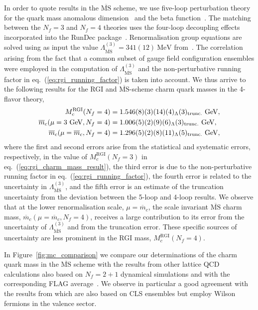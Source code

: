 In order to quote results in the $\overline{\textrm{MS}}$ scheme, we use five-loop perturbation theory for the quark
mass anomalous dimension~\cite{Baikov:2014qja,Luthe:2016xec,Baikov:2017ujl} and the beta function~\cite{Baikov:2016tgj,Herzog:2017ohr,Luthe:2017ttc}.
The matching between the $N_f=3$ and $N_f=4$ theories uses the four-loop decoupling effects~\cite{Liu:2015fxa}
incorporated into the RunDec package~\cite{Chetyrkin:2000yt,Schmidt:2012az,Herren:2017osy}. Renormalisation group equations are solved using as input the value 
$\Lambda^{(3)}_{\overline{\mathrm{MS}}} = 341(12)\ \mathrm{MeV}$ from~\cite{Bruno:2017gxd}. The correlation arising from the fact that a common subset of gauge field configuration ensembles were employed in the computation of $\Lambda^{(3)}_{\overline{\mathrm{MS}}}$ and the non-perturbative running factor in eq.~(\ref{eq:rgi_running_factor}) is taken into account. We thus arrive to the following results for the RGI and $\overline{\textrm{MS}}$-scheme charm quark masses in the 4-flavor theory,
\begin{align}
  M_c^{\mathrm{RGI}}(N_f=4)&=1.546(8)(3)(14)(4)_\Lambda(3)_{\rm trunc.} \ \mathrm{GeV},\\
  \overline{m}_c(\mu=3\ \mathrm{GeV}, N_f=4)&=1.006(5)(2)(9)(6)_\Lambda(3)_{\rm trunc.} \ \mathrm{GeV},
	\\
	\overline{m}_c(\mu=\overline{m}_c, N_f=4)&=1.296(5)(2)(8)(11)_\Lambda(5)_{\rm trunc.} \ \mathrm{GeV},
\end{align}
where the first and second errors arise from the statistical and systematic errors, respectively, in the value of $M_c^{\mathrm{RGI}}(N_f=3)$ in eq.~(\ref{eq:rgi_charm_mass_result}), the third error is due to the non-perturbative running factor in eq.~(\ref{eq:rgi_running_factor}), the fourth error is related to the uncertainty in $\Lambda^{(3)}_{\overline{\mathrm{MS}}}$, and the fifth error is an estimate of the truncation uncertainty from the deviation between the 5-loop and 4-loop results. We observe that at the lower renormalisation scale, $\mu=\overline{m}_c$, the scale invariant $\overline{\textrm{MS}}$ charm mass, $\overline{m}_c(\mu=\overline{m}_c, N_f=4)$, receives a large contribution to its error from the uncertainty of $\Lambda^{(3)}_{\overline{\mathrm{MS}}}$ and from the truncation error. These specific sources of uncertainty are less prominent in the RGI mass, $M_c^{\mathrm{RGI}}(N_f=4)$.

In Figure~\ref{fig:mc_comparison} we compare our determinations of the charm quark mass in the $\overline{\textrm{MS}}$ scheme with the results from other lattice QCD calculations also based on $N_f=2+1$ dynamical simulations and with the corresponding FLAG average~\cite{FlavourLatticeAveragingGroupFLAG:2021npn}. We observe in particular a good agreement with the results from \cite{Heitger:2021apz} which are also based on CLS ensembles but employ Wilson fermions in the valence sector.

